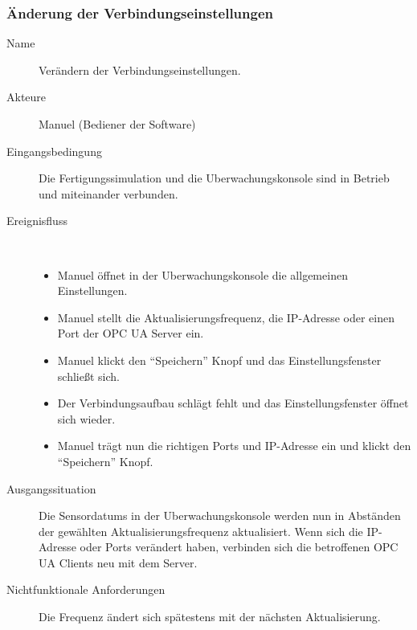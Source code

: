\documentclass[parskip=full]{scrartcl}
\begin{document}
\subsubsection{Änderung der Verbindungseinstellungen}
\begin{description}
  \item[Name] Verändern der Verbindungseinstellungen.
  \item[Akteure] Manuel (Bediener der Software)
  \item[Eingangsbedingung] Die \gls{Fertigungssimulation} und die \gls{Uberwachungskonsole} sind in Betrieb und miteinander verbunden.
  \item[Ereignisfluss]~\\
  \begin{itemize}[noitemsep]
    \item Manuel öffnet in der \gls{Uberwachungskonsole} die allgemeinen Einstellungen.
    \item Manuel stellt die Aktualisierungsfrequenz, die \gls{IP-Adresse} oder einen Port der \gls{OPC UA Server} ein.
    \item Manuel klickt den "`Speichern"' Knopf und das Einstellungsfenster schließt sich.
    \item Der Verbindungsaufbau schlägt fehlt und das Einstellungsfenster öffnet sich wieder.
    \item Manuel trägt nun die richtigen Ports und \gls{IP-Adresse} ein und klickt den "`Speichern"' Knopf.
  \end{itemize}
  \item[Ausgangssituation] Die \glspl{Sensordatum} in der \gls{Uberwachungskonsole} werden nun in Abständen der gewählten Aktualisierungsfrequenz aktualisiert.
  Wenn sich die \gls{IP-Adresse} oder Ports verändert haben, verbinden sich die betroffenen \glspl{OPC UA Client} neu mit dem Server.
  \item [Nichtfunktionale Anforderungen] Die Frequenz ändert sich spätestens mit der nächsten Aktualisierung.
\end{description}
\end{document}
